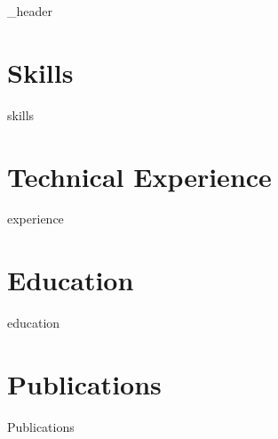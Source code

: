 \documentclass{article}
\author{Noah S. Miller} %
\begin{document}
{_header}
\section{Skills}
{skills}

\section{Technical Experience}
{experience}

\section{Education}
{education}

\section{Publications}
{Publications}

\end{document}
